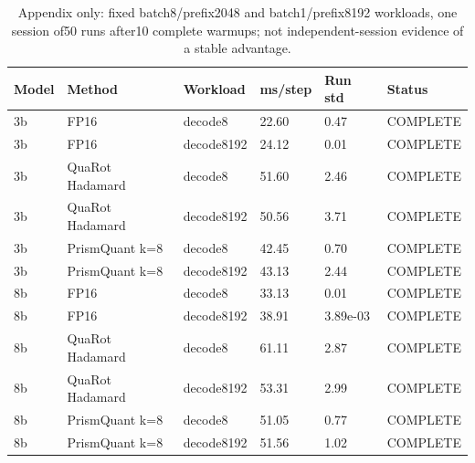 \begin{table}[t]
\centering
\small
\caption{Appendix only: fixed batch8/prefix2048 and batch1/prefix8192 workloads, one session of50 runs after10 complete warmups; not independent-session evidence of a stable advantage.}
\begin{tabular}{llllll}
\toprule
Model & Method & Workload & ms/step & Run std & Status \\
\midrule
3b & FP16 & decode8 & 22.60 & 0.47 & COMPLETE \\
3b & FP16 & decode8192 & 24.12 & 0.01 & COMPLETE \\
3b & QuaRot Hadamard & decode8 & 51.60 & 2.46 & COMPLETE \\
3b & QuaRot Hadamard & decode8192 & 50.56 & 3.71 & COMPLETE \\
3b & PrismQuant k=8 & decode8 & 42.45 & 0.70 & COMPLETE \\
3b & PrismQuant k=8 & decode8192 & 43.13 & 2.44 & COMPLETE \\
8b & FP16 & decode8 & 33.13 & 0.01 & COMPLETE \\
8b & FP16 & decode8192 & 38.91 & 3.89e-03 & COMPLETE \\
8b & QuaRot Hadamard & decode8 & 61.11 & 2.87 & COMPLETE \\
8b & QuaRot Hadamard & decode8192 & 53.31 & 2.99 & COMPLETE \\
8b & PrismQuant k=8 & decode8 & 51.05 & 0.77 & COMPLETE \\
8b & PrismQuant k=8 & decode8192 & 51.56 & 1.02 & COMPLETE \\
\bottomrule
\end{tabular}
\end{table}
